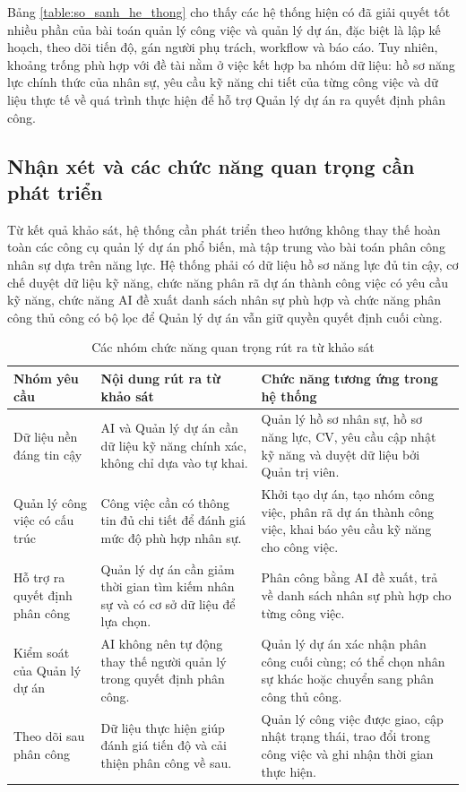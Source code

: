 \documentclass[../DoAn.tex]{subfiles}
\begin{document}
Bảng \ref{table:so_sanh_he_thong} cho thấy các hệ thống hiện có đã giải quyết tốt nhiều phần của bài toán quản lý công việc và quản lý dự án, đặc biệt là lập kế hoạch, theo dõi tiến độ, gán người phụ trách, workflow và báo cáo. Tuy nhiên, khoảng trống phù hợp với đề tài nằm ở việc kết hợp ba nhóm dữ liệu: hồ sơ năng lực chính thức của nhân sự, yêu cầu kỹ năng chi tiết của từng công việc và dữ liệu thực tế về quá trình thực hiện để hỗ trợ Quản lý dự án ra quyết định phân công.

\subsection{Nhận xét và các chức năng quan trọng cần phát triển}
\label{subsection:2.1.5}
Từ kết quả khảo sát, hệ thống cần phát triển theo hướng không thay thế hoàn toàn các công cụ quản lý dự án phổ biến, mà tập trung vào bài toán phân công nhân sự dựa trên năng lực. Hệ thống phải có dữ liệu hồ sơ năng lực đủ tin cậy, cơ chế duyệt dữ liệu kỹ năng, chức năng phân rã dự án thành công việc có yêu cầu kỹ năng, chức năng AI đề xuất danh sách nhân sự phù hợp và chức năng phân công thủ công có bộ lọc để Quản lý dự án vẫn giữ quyền quyết định cuối cùng.

\begin{table}[H]
    \centering
    \caption{Các nhóm chức năng quan trọng rút ra từ khảo sát}
    \label{table:chuc_nang_rut_ra}
    \begin{tabular}{|>{\raggedright\arraybackslash}p{}|>{\raggedright\arraybackslash}p{}|>{\raggedright\arraybackslash}p{}|}
        \hline
        \textbf{Nhóm yêu cầu} & \textbf{Nội dung rút ra từ khảo sát} & \textbf{Chức năng tương ứng trong hệ thống} \\ \hline
        Dữ liệu nền đáng tin cậy & AI và Quản lý dự án cần dữ liệu kỹ năng chính xác, không chỉ dựa vào tự khai. & Quản lý hồ sơ nhân sự, hồ sơ năng lực, CV, yêu cầu cập nhật kỹ năng và duyệt dữ liệu bởi Quản trị viên. \\ \hline
        Quản lý công việc có cấu trúc & Công việc cần có thông tin đủ chi tiết để đánh giá mức độ phù hợp nhân sự. & Khởi tạo dự án, tạo nhóm công việc, phân rã dự án thành công việc, khai báo yêu cầu kỹ năng cho công việc. \\ \hline
        Hỗ trợ ra quyết định phân công & Quản lý dự án cần giảm thời gian tìm kiếm nhân sự và có cơ sở dữ liệu để lựa chọn. & Phân công bằng AI đề xuất, trả về danh sách nhân sự phù hợp cho từng công việc. \\ \hline
        Kiểm soát của Quản lý dự án & AI không nên tự động thay thế người quản lý trong quyết định phân công. & Quản lý dự án xác nhận phân công cuối cùng; có thể chọn nhân sự khác hoặc chuyển sang phân công thủ công. \\ \hline
        Theo dõi sau phân công & Dữ liệu thực hiện giúp đánh giá tiến độ và cải thiện phân công về sau. & Quản lý công việc được giao, cập nhật trạng thái, trao đổi trong công việc và ghi nhận thời gian thực hiện. \\ \hline
    \end{tabular}
\end{table}
\end{document}
